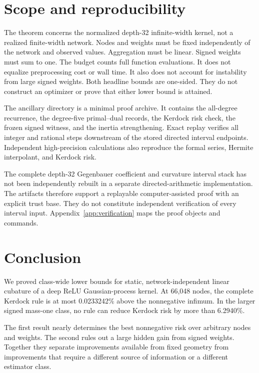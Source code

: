\documentclass[11pt]{article}
\begin{document}
\section{Scope and reproducibility}\label{scope-and-reproducibility}

The theorem concerns the normalized depth-32 infinite-width kernel, not a
realized finite-width network. Nodes and weights must be fixed independently
of the network and observed values. Aggregation must be linear. Signed
weights must sum to one. The budget counts full function evaluations. It
does not equalize preprocessing cost or wall time. It also does not account
for instability from large signed weights. Both headline bounds are
one-sided. They do not construct an optimizer or prove that either lower
bound is attained.

The ancillary directory is a minimal proof archive. It contains the
all-degree recurrence, the degree-five primal--dual records, the Kerdock
risk check, the frozen signed witness, and the inertia strengthening. Exact
replay verifies all integer and rational steps downstream of the stored
directed interval endpoints. Independent high-precision calculations also
reproduce the formal series, Hermite interpolant, and Kerdock risk.

The complete depth-32 Gegenbauer coefficient and curvature interval stack
has not been independently rebuilt in a separate directed-arithmetic
implementation. The artifacts therefore support a replayable
computer-assisted proof with an explicit trust base. They do not constitute
independent verification of every interval input. Appendix~\ref{app:verification}
maps the proof objects and commands.

\section{Conclusion}\label{conclusion}

We proved class-wide lower bounds for static, network-independent linear
cubature of a deep ReLU Gaussian-process kernel. At 66,048 nodes, the
complete Kerdock rule is at most 0.0233242\% above the nonnegative
infimum. In the larger signed mass-one class, no rule can reduce Kerdock
risk by more than 6.2940\%.

The first result nearly determines the best nonnegative risk over arbitrary
nodes and weights. The second rules out a large hidden gain from signed
weights. Together they separate improvements available from fixed geometry
from improvements that require a different source of information or a
different estimator class.
\end{document}
